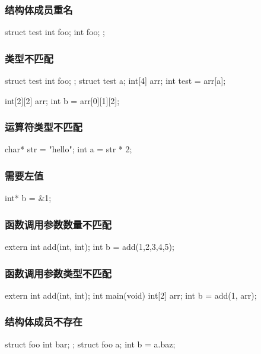 \documentclass{ctexrep}
\begin{document}
\subsubsection{结构体成员重名}
\begin{runcompiler}
struct test{
    int foo;
    int foo;
};
\end{runcompiler}
\subsubsection{类型不匹配}
\begin{runcompiler}
struct test{
    int foo;
};
struct test a;
int[4] arr;
int test = arr[a];
\end{runcompiler}
\begin{runcompiler}
int[2][2] arr;  int b = arr[0][1][2];
\end{runcompiler}
\subsubsection{运算符类型不匹配}
\begin{runcompiler}
char* str = "hello";
int a = str * 2;
\end{runcompiler}
\subsubsection{需要左值}
\begin{runcompiler}
int* b = &1;
\end{runcompiler}
\subsubsection{函数调用参数数量不匹配}
\begin{runcompiler}
extern int add(int, int);
int b = add(1,2,3,4,5);
\end{runcompiler}
\subsubsection{函数调用参数类型不匹配}
\begin{runcompiler}
extern int add(int, int);
int main(void) {
    int[2] arr;
    int b = add(1, arr);
}
\end{runcompiler}
\subsubsection{结构体成员不存在}
\begin{runcompiler}
struct foo {
    int bar;
};
struct foo a;
int b = a.baz;
\end{runcompiler}
\end{document}
